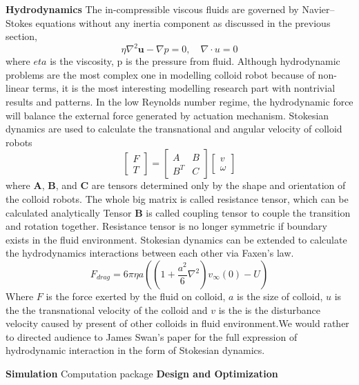 \textbf{Hydrodynamics}  The in-compressible viscous fluids are governed by Navier–Stokes equations without any inertia component as discussed in the previous section,
\begin{equation}
    \eta \nabla^2\textbf{u}-\nabla p=0,\quad \nabla \cdot u=0
\end{equation}
where $eta$ is the viscosity, p is the pressure from fluid. Although hydrodynamic problems are the most complex one in modelling colloid robot because of non-linear terms, it is the most interesting modelling research part with nontrivial results and patterns. \cite{Lauga2009,berke2008hydrodynamic,lauga2011life} In the low Reynolds number regime, the hydrodynamic force will balance the external force generated by actuation mechanism. Stokesian dynamics are used to calculate the transnational and angular velocity of colloid robots \cite{Brady1988a,Kim2005}
\begin{equation}
    \left[ \begin{array}{c} F \\ T \end{array} \right] = \begin{bmatrix} A & B \\ B^T & C \end{bmatrix} \left[ \begin{array}{c} v \\ \omega \end{array} \right]
\end{equation}
where \textbf{A}, \textbf{B}, and \textbf{C} are tensors determined only by the shape and orientation of the colloid robots. The whole big matrix is called resistance tensor, which can be calculated analytically\cite{Kim2005}  Tensor \textbf{B} is called coupling tensor to couple the transition and rotation together. Resistance tensor is no longer symmetric if boundary exists in the fluid environment.  Stokesian dynamics  can be extended to calculate the hydrodynamics interactions between each other via Faxen's law.
\begin{equation}
    F_{drag}=6 \pi \eta a((1+\frac{a^2}{6}\nabla^2)v_{\infty}(0)-U)
\end{equation}
Where $F$ is the   force exerted by the fluid on colloid, $a$ is the size of colloid, $u$ is the  the transnational  velocity of the colloid and $v$ is the is the disturbance velocity caused by present of other colloids in fluid environment.We would rather to directed audience to James Swan's paper for the full expression of hydrodynamic interaction in the form of Stokesian dynamics. \cite{swan2011modeling}


\textbf{Simulation}
Computation package \textbf{Design and Optimization}



